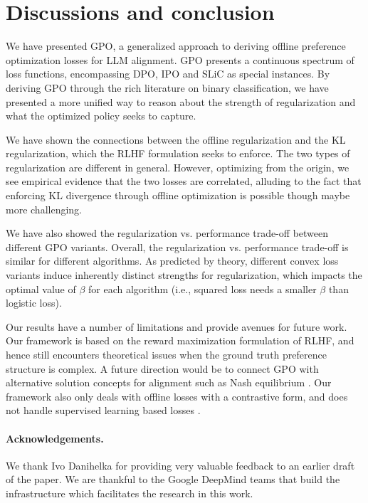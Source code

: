 \section{Discussions and conclusion}

We have presented GPO, a generalized approach to deriving offline preference optimization losses for LLM alignment. GPO presents a continuous spectrum of loss functions, encompassing DPO, IPO and SLiC as special instances. By deriving GPO through the rich literature on binary classification, we have presented a more unified way to reason about the strength of regularization and what the optimized policy seeks to capture.

We have shown the connections between the offline regularization and the KL regularization, which the RLHF formulation seeks to enforce. The two types of regularization are different in general. However, optimizing from the origin, we see empirical evidence that the two losses are correlated, alluding to the fact that enforcing KL divergence through offline optimization is possible though maybe more challenging. 

We have also showed the regularization vs. performance trade-off between different GPO variants. Overall, the regularization vs. performance trade-off is similar for different algorithms. As predicted by theory, different convex loss variants induce inherently distinct strengths for regularization, which impacts the optimal value of $\beta$ for each algorithm (i.e., squared loss needs a smaller $\beta$ than logistic loss).

Our results have a number of limitations and provide avenues for future work. Our framework is based on the reward maximization formulation of RLHF, and hence still encounters theoretical issues when the ground truth preference structure is complex. A future direction would be to connect GPO with alternative solution concepts for alignment such as Nash equilibrium \citep{munos2023nash}. Our framework also only deals with offline losses with a contrastive form, and does not handle supervised learning based losses \citep{zhao2023SLiC}.

\paragraph{Acknowledgements.} We thank Ivo Danihelka for providing very valuable feedback to an earlier draft of the paper. We are thankful to the Google DeepMind teams that build the infrastructure which facilitates the research in this work.

\newpage

